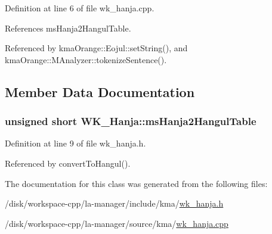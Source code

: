 Definition at line 6 of file wk\_\-hanja.cpp.

References msHanja2HangulTable.

Referenced by kmaOrange::Eojul::setString(), and kmaOrange::MAnalyzer::tokenizeSentence().

\subsection{Member Data Documentation}
\hypertarget{classkmaOrange_1_1WK__Hanja_5a812cbe0dc8d122d354b859f50635a8}{
\subsubsection[{msHanja2HangulTable}]{\setlength{\rightskip}{0pt plus 5cm}unsigned short {\bf WK\_\-Hanja::msHanja2HangulTable}}}
\label{classkmaOrange_1_1WK__Hanja_5a812cbe0dc8d122d354b859f50635a8}




Definition at line 9 of file wk\_\-hanja.h.

Referenced by convertToHangul().

The documentation for this class was generated from the following files:\begin{CompactItemize}
\item 
/disk/workspace-cpp/la-manager/include/kma/\hyperlink{wk__hanja_8h}{wk\_\-hanja.h}\item 
/disk/workspace-cpp/la-manager/source/kma/\hyperlink{wk__hanja_8cpp}{wk\_\-hanja.cpp}\end{CompactItemize}
